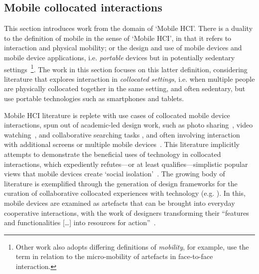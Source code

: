 


\subsection{Mobile collocated interactions}\label{sec:background litreview design mobilehci}
This section introduces work from the domain of `Mobile \ac{HCI}'.
There is a duality to the definition of mobile in the sense of `Mobile \ac{HCI}', in that it refers to interaction and physical mobility; or the design and use of mobile devices and mobile device applications, i.e. \textit{portable} devices but in potentially sedentary settings~\citep{Church2011}\footnote{Other work also adopts differing definitions of \textit{mobility}, for example, \citet{Luff1998a} use the term in relation to the micro-mobility of artefacts in face-to-face interaction.}.
The work in this section focuses on this latter definition, considering literature that explores interaction in \textit{collocated settings}, i.e. when multiple people are physically collocated together in the same setting, and often sedentary, but use portable technologies such as smartphones and tablets.






Mobile \ac{HCI} literature is replete with use cases of collocated mobile device interactions, spun out of academic-led design work, such as photo sharing~\citep{Counts2004,Durrant2011}, video watching~\citep{OHara2007}, and collaborative searching tasks \citep{Church2012,Cole2003,Brown2015}, and often involving interaction with additional screens or multiple mobile devices~\citep{Bergstrom-lehtovirta2013,Lucero2013}.
This literature implicitly attempts to demonstrate the beneficial uses of technology in collocated interactions, which expediently refutes---or at least qualifies---simplistic popular views that mobile devices create `social isolation'~\citep{Turkle2011}.
The growing body of literature is exemplified through the generation of design frameworks for the curation of collaborative collocated experiences with technology (e.g. \citet{Lundgren2015}).
In this, mobile devices are examined as artefacts that can be brought into everyday cooperative interactions, with the work of designers transforming their ``features and functionalities [\ldots] into resources for action''~\citep[p. 1117]{Salovaara2007}.

